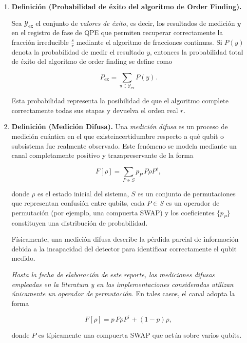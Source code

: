 \documentclass[letterpaper]{article}
\begin{document}
\begin{enumerate}
Además, un valor $y$ \emph{deja de ser de éxito} si la fracción obtenida mediante fracciones continuas es reducible, es decir, si existe un divisor 
$d>1$ tal que
\[
\frac{s}{r} = \frac{s/d}{r/d}.
\]
En tal caso, el denominador obtenido no corresponde al orden real buscado.

\item \textbf{Definición (Probabilidad de éxito del algoritmo de Order Finding).}

Sea $\mathcal{Y}_{\mathrm{ex}}$ el conjunto de \emph{valores de éxito}, es decir, los resultados de medición $y$ en el registro de fase de QPE que permiten recuperar correctamente la fracción irreducible $\frac{s}{r}$ mediante el algoritmo de fracciones continuas. Si $P(y)$ denota la probabilidad de medir el resultado $y$, entonces la probabilidad total de 
éxito del algoritmo de order finding se define como

\[
P_{\mathrm{ex}} = \sum_{y \in \mathcal{Y}_{\mathrm{ex}}} P(y).
\]

Esta probabilidad representa la posibilidad de que el algoritmo complete correctamente todas sus etapas y devuelva el orden real $r$.

\item\textbf{Definición (Medición Difusa).}
Una \emph{medición difusa} es un proceso de medición cuántica en el que existeincertidumbre respecto a qué qubit o subsistema fue realmente observado. Este fenómeno se modela mediante un canal completamente positivo y
trazapreservante de la forma

\[
F[\rho] = \sum_{P \in S} p_P\, P \rho P^\dagger,
\]

donde $\rho$ es el estado inicial del sistema, $S$ es un conjunto de permutaciones que representan confusión entre qubits, cada $P\in S$ es un operador de permutación (por ejemplo, una compuerta SWAP) y los coeficientes $\{p_P\}$ constituyen una distribución de probabilidad.

Físicamente, una medición difusa describe la pérdida parcial de información debida a la incapacidad del detector para identificar correctamente el qubit medido.

\textit{Hasta la fecha de elaboración de este reporte, las mediciones difusas empleadas en la literatura y en las implementaciones consideradas utilizan únicamente un operador de permutación}. En tales casos, el canal adopta la forma

\[
F[\rho] = p\, P\rho P^\dagger + (1-p)\rho,
\]

donde $P$ es típicamente una compuerta SWAP que actúa sobre varios qubits.


\end{enumerate}
\end{document}
